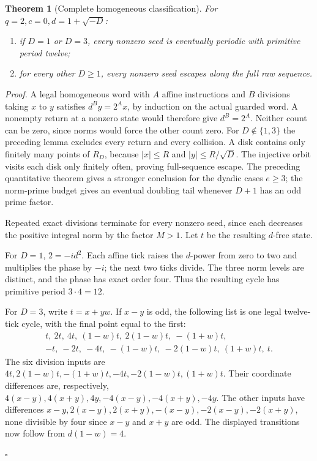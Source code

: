 \documentclass[11pt,letterpaper]{article}
\newtheorem{theorem}{Theorem}
\newenvironment{proof}{\noindent\textit{Proof.}}{\hfill\(\square\)}
\begin{document}
\begin{theorem}[Complete homogeneous classification]
For \(q=2,c=0,d=1+\sqrt{-D}\):
\begin{enumerate}
\item if \(D=1\) or \(D=3\), every nonzero seed is eventually periodic
with primitive period twelve;
\item for every other \(D\ge1\), every nonzero seed escapes along the
full raw sequence.
\end{enumerate}
\end{theorem}
\begin{proof}
A legal homogeneous word with \(A\) affine instructions and \(B\)
divisions taking \(x\) to \(y\) satisfies \(d^B y=2^A x\), by induction
on the actual guarded word. A nonempty return at a nonzero state
would therefore give \(d^B=2^A\). Neither count can be zero, since
norms would force the other count zero. For \(D\notin\{1,3\}\) the
preceding lemma excludes every return and every collision.
A disk contains only finitely many points of \(R_D\), because
\(|x|\le R\) and \(|y|\le R/\sqrt D\). The injective orbit visits
each disk only finitely often, proving full-sequence escape.
The preceding quantitative theorem gives a stronger conclusion for
the dyadic cases \(e\ge3\); the norm-prime budget gives an eventual
doubling tail whenever \(D+1\) has an odd prime factor.

Repeated exact divisions terminate for every nonzero seed, since
each decreases the positive integral norm by the factor \(M>1\).
Let \(t\) be the resulting \(d\)-free state.

For \(D=1\), \(2=-i d^2\). Each affine tick raises the \(d\)-power
from zero to two and multiplies the phase by \(-i\); the next two
ticks divide. The three norm levels are distinct, and the phase
has exact order four. Thus the resulting cycle has primitive period
\(3\cdot4=12\).

For \(D=3\), write \(t=x+yw\). If \(x-y\) is odd, the following list
is one legal twelve-tick cycle, with the final point equal to the first:
\[
\begin{gathered}
t,\ 2t,\ 4t,\ (1-w)t,\ 2(1-w)t,\ -(1+w)t,\\
-t,\ -2t,\ -4t,\ -(1-w)t,\ -2(1-w)t,\ (1+w)t,\ t.
\end{gathered}
\]
The six division inputs are
\(4t,2(1-w)t,-(1+w)t,-4t,-2(1-w)t,(1+w)t\).
Their coordinate differences are, respectively,
\(4(x-y),4(x+y),4y,-4(x-y),-4(x+y),-4y\).
The other inputs have differences
\(x-y,2(x-y),2(x+y),-(x-y),-2(x-y),-2(x+y)\),
none divisible by four since \(x-y\) and \(x+y\) are odd.
The displayed transitions now follow from \(d(1-w)=4\).


\end{proof}
\end{document}

